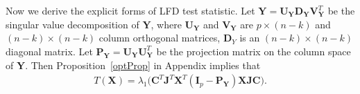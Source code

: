 \documentclass[12pt]{article} %
\newcommand{\bX}{\mathbf{X}}
\newcommand{\bP}{\mathbf{P}}
\newcommand{\bY}{\mathbf{Y}}
\newcommand{\bJ}{\mathbf{J}}
\newcommand{\bC}{\mathbf{C}}
\newcommand{\bI}{\mathbf{I}}
\newcommand{\bU}{\mathbf{U}}
\newcommand{\bD}{\mathbf{D}}
\newcommand{\bV}{\mathbf{V}}
\theoremstyle{definition}
\begin{document}
Now we derive the explicit forms of LFD test statistic. 
Let $\bY=\bU_{\bY}\bD_{\bY}\bV_{\bY}^T$ be the singular value decomposition of $\bY$, where $\bU_{\bY}$ and $\bV_{\bY}$ are $p\times (n-k)$ and $(n-k)\times(n-k)$ column orthogonal matrices, $\bD_{Y}$ is an $(n-k)\times (n-k)$ diagonal matrix.
Let $\bP_{\bY}=\bU_{\bY}\bU_{\bY}^T$ be the projection matrix on the column space of $\bY$.
Then Proposition~\ref{optProp} in Appendix implies that
\begin{equation}\label{statisticForm1}
\begin{aligned}
    T(\bX)
    =\lambda_{1}\big(\bC^T\bJ^T\bX^T (\bI_p-
    \bP_{\bY}
    )\bX\bJ\bC\big).
\end{aligned}
\end{equation}
\end{document}

